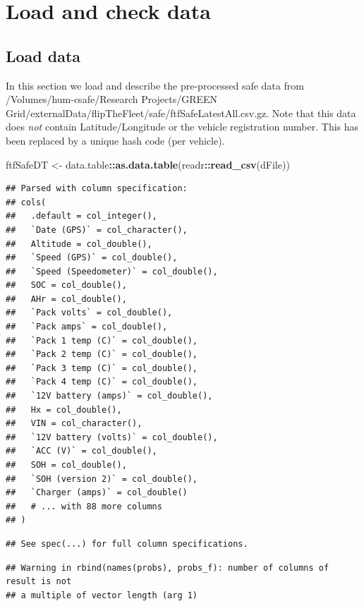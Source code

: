 \documentclass[]{article}
\newenvironment{Shaded}{\begin{snugshade}}{\end{snugshade}}
\newcommand{\KeywordTok}[1]{\textcolor[rgb]{0.13,0.29,0.53}{\textbf{#1}}}
\newcommand{\StringTok}[1]{\textcolor[rgb]{0.31,0.60,0.02}{#1}}
\newcommand{\OperatorTok}[1]{\textcolor[rgb]{0.81,0.36,0.00}{\textbf{#1}}}
\newcommand{\NormalTok}[1]{#1}
\begin{document}
\section{Load and check data}\label{load-and-check-data}

\subsection{Load data}\label{load-data}

In this section we load and describe the pre-processed safe data from
/Volumes/hum-csafe/Research Projects/GREEN
Grid/externalData/flipTheFleet/safe/ftfSafeLatestAll.csv.gz. Note that
this data does \emph{not} contain Latitude/Longitude or the vehicle
registration number. This has been replaced by a unique hash code (per
vehicle).

\begin{Shaded}
\begin{Highlighting}[]
\NormalTok{ftfSafeDT <-}\StringTok{ }\NormalTok{data.table}\OperatorTok{::}\KeywordTok{as.data.table}\NormalTok{(readr}\OperatorTok{::}\KeywordTok{read_csv}\NormalTok{(dFile))}
\end{Highlighting}
\end{Shaded}

\begin{verbatim}
## Parsed with column specification:
## cols(
##   .default = col_integer(),
##   `Date (GPS)` = col_character(),
##   Altitude = col_double(),
##   `Speed (GPS)` = col_double(),
##   `Speed (Speedometer)` = col_double(),
##   SOC = col_double(),
##   AHr = col_double(),
##   `Pack volts` = col_double(),
##   `Pack amps` = col_double(),
##   `Pack 1 temp (C)` = col_double(),
##   `Pack 2 temp (C)` = col_double(),
##   `Pack 3 temp (C)` = col_double(),
##   `Pack 4 temp (C)` = col_double(),
##   `12V battery (amps)` = col_double(),
##   Hx = col_double(),
##   VIN = col_character(),
##   `12V battery (volts)` = col_double(),
##   `ACC (V)` = col_double(),
##   SOH = col_double(),
##   `SOH (version 2)` = col_double(),
##   `Charger (amps)` = col_double()
##   # ... with 88 more columns
## )
\end{verbatim}

\begin{verbatim}
## See spec(...) for full column specifications.
\end{verbatim}

\begin{verbatim}
## Warning in rbind(names(probs), probs_f): number of columns of result is not
## a multiple of vector length (arg 1)
\end{verbatim}
\end{document}

